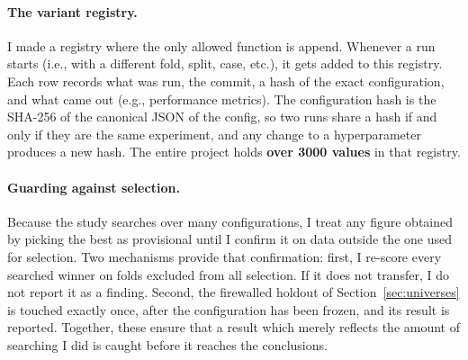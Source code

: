 \paragraph{The variant registry.} I made a registry where the only allowed function is append. Whenever a run starts (i.e., with a different fold, split, case, etc.), it gets added to this registry. Each row records what was run, the commit, a hash of the exact configuration, and what came out (e.g., performance metrics). The configuration hash is the SHA-256 of the canonical JSON of the config, so two runs share a hash if and only if they are the same experiment, and any change to a hyperparameter produces a new hash. The entire project holds \textbf{over 3000 values} in that registry.

\paragraph{Guarding against selection.} Because the study searches over many configurations, I treat any figure obtained by picking the best as provisional until I confirm it on data outside the one used for selection. Two mechanisms provide that confirmation: first, I re-score every searched winner on folds excluded from all selection. If it does not transfer, I do not report it as a finding. Second, the firewalled holdout of Section~\ref{sec:universes} is touched exactly once, after the configuration has been frozen, and its result is reported. Together, these ensure that a result which merely reflects the amount of searching I did is caught before it reaches the conclusions.